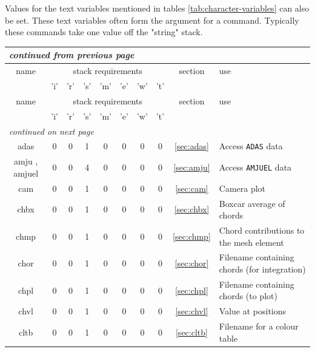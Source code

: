 \documentclass[a4paper,10pt]{report}
\begin{document}
Values for the text variables mentioned in
tables \ref{tab:character-variables} can also be set.  These text
variables often form the argument for a command.  Typically these
commands take one value off the "string" stack.

\begin{center}
  \begin{longtable}{|c|c|c|c|c|c|c|c|c|l|}
    \hline
    \multicolumn{10}{|l|}{\small\sl continued from previous page} \\
    \hline name & \multicolumn{7}{|c|}{stack requirements} & section & use \\
    \hline   & 'i' & 'r' & 's' & 'm' & 'e' & 'w' & 't' &   &   \\
    \hline \endhead
    \hline name & \multicolumn{7}{|c|}{stack requirements} & section & use \\
    \hline   & 'i' & 'r' & 's' & 'm' & 'e' & 'w' & 't' &   &   \\
    \hline \endfirsthead
    \hline
    \multicolumn{10}{|l|}{\small\sl continued on next page} \\
    \hline \endfoot
    \endlastfoot
    adas \index{b2plot, adas}    & 0 & 0 & 1 & 0 & 0 & 0 & 0 & \ref{sec:adas}     & Access {\tt ADAS} data \\
    amju \index{b2plot, amju}, amjuel \index{b2plot, anjuel} & 0 & 0 & 4 & 0 & 0 & 0 & 0 & \ref{sec:amju} & Access {\tt AMJUEL} data \\
    cam \index{b2plot, cam}      & 0 & 0 & 1 & 0 & 0 & 0 & 0 & \ref{sec:cam}      & Camera plot \\
    chbx \index{b2plot, chbx}    & 0 & 0 & 1 & 0 & 0 & 0 & 0 & \ref{sec:chbx}     & Boxcar average of chords \\
    chmp \index{b2plot, chmp}    & 0 & 0 & 1 & 0 & 0 & 0 & 0 & \ref{sec:chmp}     & Chord contributions to the mesh element \\
    chor \index{b2plot, chor}    & 0 & 0 & 1 & 0 & 0 & 0 & 0 & \ref{sec:chor}     & Filename containing chords (for integration) \\
    chpl \index{b2plot, chpl}    & 0 & 0 & 1 & 0 & 0 & 0 & 0 & \ref{sec:chpl}     & Filename containing chords (to plot) \\
    chvl \index{b2plot, chvl}    & 0 & 0 & 1 & 0 & 0 & 0 & 0 & \ref{sec:chvl}     & Value at positions \\
    cltb \index{b2plot, cltb}    & 0 & 0 & 1 & 0 & 0 & 0 & 0 & \ref{sec:cltb}     & Filename for a colour table \\

\end{longtable}
\end{center}
\end{document}
